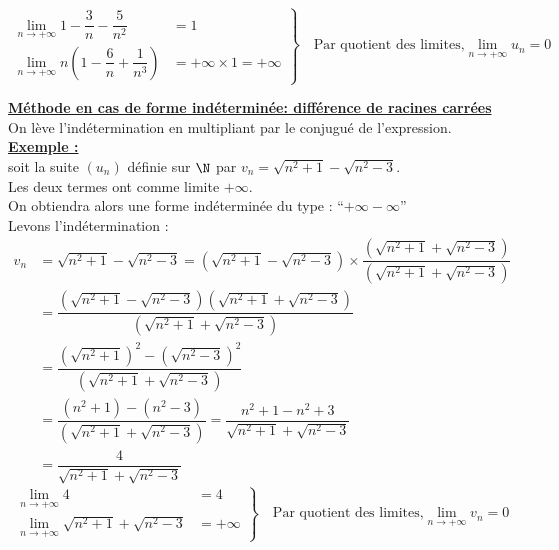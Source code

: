 \documentclass[11pt,twoside, openany]{extbook}
\begin{document}
\begin{tcolorbox}[colback= white, colframe=black!80, title= \section*{Méthode : Lever l’indétermination pour un polynôme}]
\begin{equation*}
	\left.
	\begin{aligned}
		\lim\limits_{n \rightarrow +\infty} 1-\dfrac{3}{n}-\dfrac{5}{n^2} &= 1 \quad \\
		\lim\limits_{n \rightarrow +\infty} n\left(1-\dfrac{6}{n}+\dfrac{1}{n^3}\right) &= +\infty \times 1= +\infty 
	\end{aligned}
	\right\}
	\quad \text{Par quotient des limites,$\lim\limits_{n \rightarrow +\infty}u_n=0$}
\end{equation*}

\end{tcolorbox}









\newpage
\noindent
\ul{\bf Méthode en cas de forme indéterminée: différence de racines carrées} \\ On lève l'indétermination en multipliant par le conjugué de l'expression.
\\
\noindent \textbf{\ul{Exemple :}}\\soit la suite $(u_n)$ définie sur $\N$ par $v_n= \sqrt{n^2+1}-\sqrt{n^2-3}$. \\
Les deux termes ont comme limite $+\infty$.\\ On obtiendra alors une forme indéterminée du type : \enquote{$+\infty-\infty$}\\
Levons l’indétermination :\vspace{0.5em}
\begin{align*}
v_n&= \sqrt{n^2+1}-\sqrt{n^2-3}
=\left(\sqrt{n^2+1}-\sqrt{n^2-3}\right) \times \dfrac{\left(\sqrt{n^2+1}+\sqrt{n^2-3}\right)}{\left(\sqrt{n^2+1}+\sqrt{n^2-3}\right)}\\
&= \dfrac{\left(\sqrt{n^2+1}-\sqrt{n^2-3}\right)\left(\sqrt{n^2+1}+\sqrt{n^2-3}\right)}{\left(\sqrt{n^2+1}+\sqrt{n^2-3}\right)}
\\&=\dfrac{\left(\sqrt{n^2+1}\right)^2-\left(\sqrt{n^2-3}\right)^2}{\left(\sqrt{n^2+1}+\sqrt{n^2-3}\right)}\\
&=\dfrac{\left(n^2+1\right)-\left(n^2-3\right)}{\left(\sqrt{n^2+1}+\sqrt{n^2-3}\right)}
=\dfrac{n^2+1-n^2+3}{\sqrt{n^2+1}+\sqrt{n^2-3}}
\\&=\dfrac{4}{\sqrt{n^2+1}+\sqrt{n^2-3}}
\end{align*}
\begin{equation*}
	\left.
	\begin{aligned}
		\lim\limits_{n \rightarrow +\infty}4 &= 4 \quad \\
		\lim\limits_{n \rightarrow +\infty}\sqrt{n^2+1}+\sqrt{n^2-3} &= +\infty 
	\end{aligned}
	\right\}
	\quad \text{Par quotient des limites,$\lim\limits_{n \rightarrow +\infty}v_n=0$}
\end{equation*}
\end{document}
